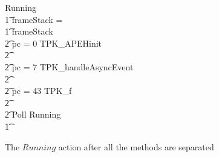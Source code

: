 
\begin{figure}[t!]
  \setlength{\zedindent}{0cm}
  \setlength{\zedtab}{0.3cm}
  \setlength{\zedleftsep}{0cm}
  \setlength{\abovedisplayskip}{0cm}
  \setlength{\belowdisplayskip}{0cm}
  \small
  \begin{circus}
    Running \circdef \\
    \t1 \circif frameStack = \emptyset \circthen \Skip \\
    \t1 {} \circelse frameStack \neq \emptyset \circthen {} \\
    \t2 {} \circif pc = 0 \circthen TPK\_APEHinit \\
    \t2 {} \cdots {} \\
    \t2 {} \circelse pc = 7 \circthen TPK\_handleAsyncEvent \\
    \t2 {} \cdots {} \\
    \t2 {} \circelse pc = 43 \circthen TPK\_f \\
    \t2 {} \cdots {} \\
    \t2 \circfi \circseq Poll \circseq Running \\
    \t1 \circfi
  \end{circus}
  \caption{The $Running$ action after all the methods are separated}
  \label{final-method-separation-example-figure}
\end{figure}


